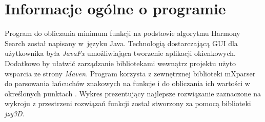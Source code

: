 \documentclass[10pt, a4paper]{article}
\begin{document}
\pagebreak

\section{Informacje ogólne o programie}
\label{sec:implementacja}
Program do obliczania minimum funkcji na podstawie algorytmu Harmony Search został napisany w~języku Java. Technologią dostarczającą GUI dla użytkownika była {\em JavaFx} umożliwiająca tworzenie aplikacji okienkowych. Dodatkowo by ułatwić zarządzanie bibliotekami wewnątrz projektu użyto wsparcia ze strony {\em Maven}.  Program korzysta z zewnętrznej biblioteki mXparser do parsowania łańcuchów znakowych na funkcje i do obliczania ich wartości w określonych punktach \cite{bib:mathparser}. Wykres prezentujący najlepsze rozwiązanie zaznaczone na wykroju z przestrzeni rozwiązań funkcji został stworzony za pomocą biblioteki {\em jzy3D}.
\end{document}
